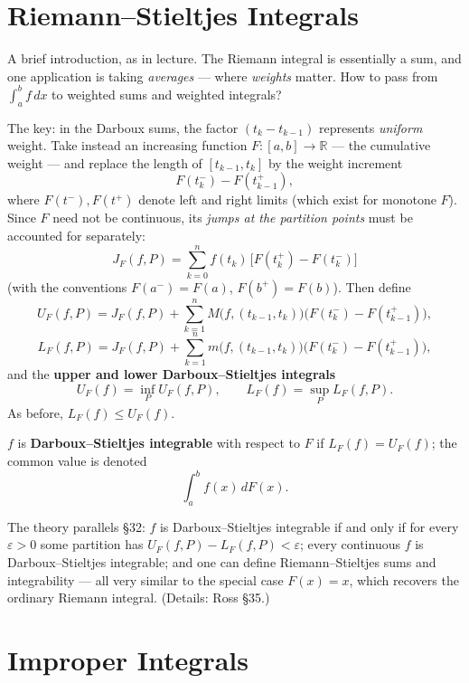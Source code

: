 \documentclass[11pt]{report}
\begin{document}
\section{Riemann--Stieltjes Integrals}

A brief introduction, as in lecture. The Riemann integral is essentially a sum, and one application is taking \emph{averages} --- where \emph{weights} matter. How to pass from $\int_a^b f\,dx$ to weighted sums and weighted integrals?

The key: in the Darboux sums, the factor $(t_k - t_{k-1})$ represents \emph{uniform} weight. Take instead an increasing function $F: [a,b] \to \mathbb{R}$ --- the cumulative weight --- and replace the length of $[t_{k-1}, t_k]$ by the weight increment
\[
F(t_k^-) - F(t_{k-1}^+),
\]
where $F(t^-), F(t^+)$ denote left and right limits (which exist for monotone $F$). Since $F$ need not be continuous, its \emph{jumps at the partition points} must be accounted for separately:
\[
J_F(f, P) = \sum_{k=0}^{n} f(t_k)\,\bigl[ F(t_k^+) - F(t_k^-) \bigr]
\]
(with the conventions $F(a^-) = F(a)$, $F(b^+) = F(b)$). Then define
\[
U_F(f, P) = J_F(f,P) + \sum_{k=1}^n M\bigl(f, (t_{k-1}, t_k)\bigr)\bigl( F(t_k^-) - F(t_{k-1}^+) \bigr),
\]
\[
L_F(f, P) = J_F(f,P) + \sum_{k=1}^n m\bigl(f, (t_{k-1}, t_k)\bigr)\bigl( F(t_k^-) - F(t_{k-1}^+) \bigr),
\]
and the \textbf{upper and lower Darboux--Stieltjes integrals}
\[
U_F(f) = \inf_P U_F(f, P), \qquad L_F(f) = \sup_P L_F(f, P).
\]
As before, $L_F(f) \leq U_F(f)$.

\begin{defbox}
$f$ is \textbf{Darboux--Stieltjes integrable} with respect to $F$ if $L_F(f) = U_F(f)$; the common value is denoted
\[
\int_a^b f(x)\,dF(x).
\]
\end{defbox}

The theory parallels \S 32: $f$ is Darboux--Stieltjes integrable if and only if for every $\varepsilon > 0$ some partition has $U_F(f,P) - L_F(f,P) < \varepsilon$; every continuous $f$ is Darboux--Stieltjes integrable; and one can define Riemann--Stieltjes sums and integrability --- all very similar to the special case $F(x) = x$, which recovers the ordinary Riemann integral. (Details: Ross \S 35.)


\section{Improper Integrals}
\end{document}
